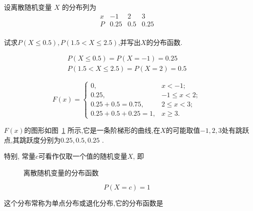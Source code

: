 \begin{example}
	设离散随机变量 $X$ 的分布列为
	\[
	\begin{array}{c|ccc}
	x & -1 & 2 & 3 \\\hline
	P & 0.25 & 0.5 & 0.25 \\
	\end{array}
	\]
	
	试求$P(X \leqslant 0.5), P(1.5<X \leqslant 2.5)$,并写出$ X $的分布函数.
\end{example}
\begin{solution}
	
	\[
	\begin{array}{l}{P(X \leqslant 0.5)=P(X=-1)=0.25} \\ {P(1.5<X \leqslant 2.5)=P(X=2)=0.5}\end{array}
	\]
	
	\[
	  F(x) = \begin{cases}
	    0, & x<-1; \\
	    0.25, & -1 \leqslant x<2; \\
	    0.25 + 0.5 = 0.75, & 2 \leqslant x < 3; \\
	    0.25 + 0.5 + 0.25 = 1, & x \geqslant 3.
	\end{cases}
    \]
	
	$ F(x) $的图形如图~\ref{fig:2-1-3} 所示,它是一条阶梯形的曲线,在$ X $的可能取值$-1,2,3$处有跳跃点,其跳跃度分别为$ 0.25,0.5,0.25 $ .
	
	
	特别, 常量$ c $可看作仅取一个值的随机变量$X$, 即
	
	\begin{figure}
\centering
{}
\caption{离散随机变量的分布函数}\label{fig:2-1-3}
\end{figure}
	
	\[
	P(X=c)=1
	\]
	
	这个分布常称为单点分布或退化分布,它的分布函数是
	

\end{solution}
